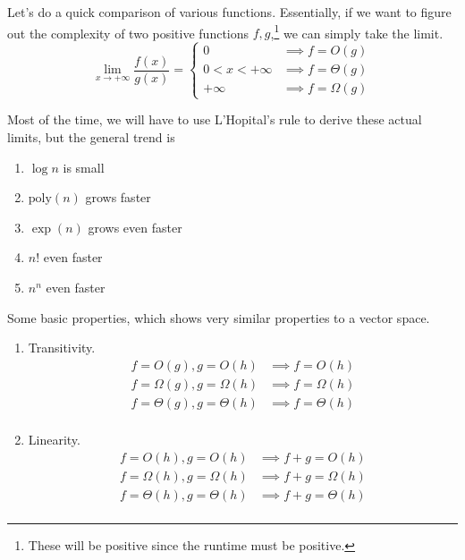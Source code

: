 \documentclass{article}
\begin{document}
    Let's do a quick comparison of various functions. Essentially, if we want to figure out the complexity of two positive functions $f, g$,\footnote{These will be positive since the runtime must be positive.} we can simply take the limit. 
    \begin{equation}
      \lim_{x \rightarrow +\infty} \frac{f(x)}{g(x)} = \begin{cases} 
        0 & \implies f = O(g) \\
        0 < x < +\infty & \implies f = \Theta(g) \\
        +\infty & \implies f = \Omega(g)
      \end{cases}
    \end{equation} 

    Most of the time, we will have to use L'Hopital's rule to derive these actual limits, but the general trend is 
    \begin{enumerate}
      \item $\log n$ is small  
      \item $\mathrm{poly}(n)$ grows faster
      \item $\exp(n)$ grows even faster 
      \item $n!$ even faster
      \item $n^n$ even faster
    \end{enumerate}

    \begin{theorem}[Properties]
      Some basic properties, which shows very similar properties to a vector space. 
      \begin{enumerate}
        \item Transitivity. 
        \begin{align}
          f = O(g), g = O(h) & \implies f = O(h) \\
          f = \Omega(g), g = \Omega(h) & \implies f = \Omega(h) \\
          f = \Theta(g), g = \Theta(h) & \implies f = \Theta(h) \\
        \end{align}

        \item Linearity.  
          \begin{align}
            f = O(h), g = O(h) & \implies f + g = O(h) \\
            f = \Omega(h), g = \Omega(h) & \implies f + g = \Omega(h) \\
            f = \Theta(h), g = \Theta(h) & \implies f + g = \Theta(h) \\
          \end{align}
      \end{enumerate}
    \end{theorem}
\end{document}
